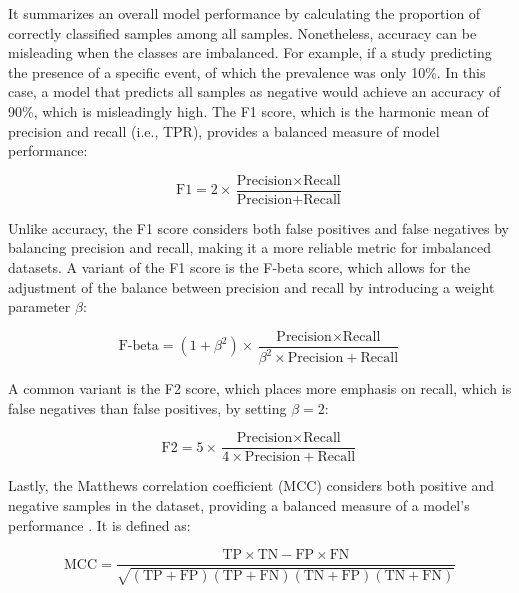 It summarizes an overall model performance by calculating the proportion of correctly classified samples among all samples. Nonetheless, accuracy can be misleading when the classes are imbalanced. For example, if a study predicting the presence of a specific event, of which the prevalence was only 10\%. In this case, a model that predicts all samples as negative would achieve an accuracy of 90\%, which is misleadingly high. 
The F1 score, which is the harmonic mean of precision and recall (i.e., TPR), provides a balanced measure of model performance:

\begin{equation} \label{eq_f1}
    \text{F1} = 2 \times \frac{\text{Precision} \times \text{Recall}}{\text{Precision} + \text{Recall}}
\end{equation}

Unlike accuracy, the F1 score considers both false positives and false negatives by balancing precision and recall, making it a more reliable metric for imbalanced datasets. A variant of the F1 score is the F-beta score, which allows for the adjustment of the balance between precision and recall by introducing a weight parameter $\beta$:

\begin{equation} \label{eq_fbeta}
    \text{F-beta} = (1 + \beta^2) \times \frac{\text{Precision} \times \text{Recall}}{\beta^2 \times \text{Precision} + \text{Recall}}
\end{equation}

A common variant is the F2 score, which places more emphasis on recall, which is false negatives than false positives, by setting $\beta = 2$:

\begin{equation} \label{eq_f2}
    \text{F2} = 5 \times \frac{\text{Precision} \times \text{Recall}}{4 \times \text{Precision} + \text{Recall}}
\end{equation}

Lastly, the Matthews correlation coefficient (MCC) considers both positive and negative samples in the dataset, providing a balanced measure of a model's performance \citep{chicco_advantages_2020}. It is defined as:

\begin{equation} \label{eq_mcc}
    \text{MCC} = \frac{\text{TP} \times \text{TN} - \text{FP} \times \text{FN}}{\sqrt{(\text{TP} + \text{FP})(\text{TP} + \text{FN})(\text{TN} + \text{FP})(\text{TN} + \text{FN})}}
\end{equation}

